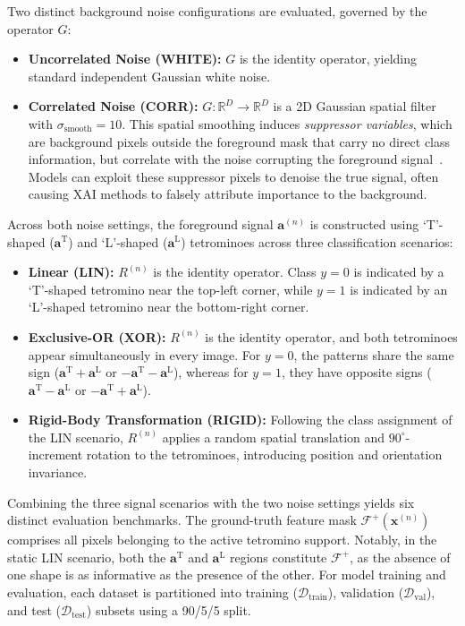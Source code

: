 \documentclass[pdflatex,sn-mathphys-num]{sn-jnl}
\theoremstyle{thmstyleone}
\theoremstyle{thmstyletwo}%
\theoremstyle{thmstylethree}%
\begin{document}
Two distinct background noise configurations are evaluated, governed by the operator $G$:
\begin{itemize}
    \item \textbf{Uncorrelated Noise (WHITE):} $G$ is the identity operator, yielding standard independent Gaussian white noise.
    \item \textbf{Correlated Noise (CORR):} $G: \mathbb{R}^D \to \mathbb{R}^D$ is a 2D Gaussian spatial filter with $\sigma_{\text{smooth}} = 10$. This spatial smoothing induces \emph{suppressor variables}, which are background pixels outside the foreground mask that carry no direct class information, but correlate with the noise corrupting the foreground signal~\cite{haufe2014, wilming2022}. Models can exploit these suppressor pixels to denoise the true signal, often causing XAI methods to falsely attribute importance to the background.
\end{itemize}

Across both noise settings, the foreground signal $\mathbf{a}^{(n)}$ is constructed using `T'-shaped ($\mathbf{a}^{\text{T}}$) and `L'-shaped ($\mathbf{a}^{\text{L}}$) tetrominoes across three classification scenarios:
\begin{itemize}
    \item \textbf{Linear (LIN):} $R^{(n)}$ is the identity operator. Class $y = 0$ is indicated by a `T'-shaped tetromino near the top-left corner, while $y = 1$ is indicated by an `L'-shaped tetromino near the bottom-right corner.
    \item \textbf{Exclusive-OR (XOR):} $R^{(n)}$ is the identity operator, and both tetrominoes appear simultaneously in every image. For $y = 0$, the patterns share the same sign ($\mathbf{a}^{\text{T}} + \mathbf{a}^{\text{L}}$ or $-\mathbf{a}^{\text{T}} - \mathbf{a}^{\text{L}}$), whereas for $y = 1$, they have opposite signs ($\mathbf{a}^{\text{T}} - \mathbf{a}^{\text{L}}$ or $-\mathbf{a}^{\text{T}} + \mathbf{a}^{\text{L}}$).
    \item \textbf{Rigid-Body Transformation (RIGID):} Following the class assignment of the LIN scenario, $R^{(n)}$ applies a random spatial translation and $90^\circ$-increment rotation to the tetrominoes, introducing position and orientation invariance.
\end{itemize}

Combining the three signal scenarios with the two noise settings yields six distinct evaluation benchmarks. The ground-truth feature mask $\mathcal{F}^+(\mathbf{x}^{(n)})$ comprises all pixels belonging to the active tetromino support. Notably, in the static LIN scenario, both the $\mathbf{a}^{\text{T}}$ and $\mathbf{a}^{\text{L}}$ regions constitute $\mathcal{F}^+$, as the absence of one shape is as informative as the presence of the other. For model training and evaluation, each dataset is partitioned into training ($\mathcal{D}_{\text{train}}$), validation ($\mathcal{D}_{\text{val}}$), and test ($\mathcal{D}_{\text{test}}$) subsets using a 90/5/5 split.
\end{document}
